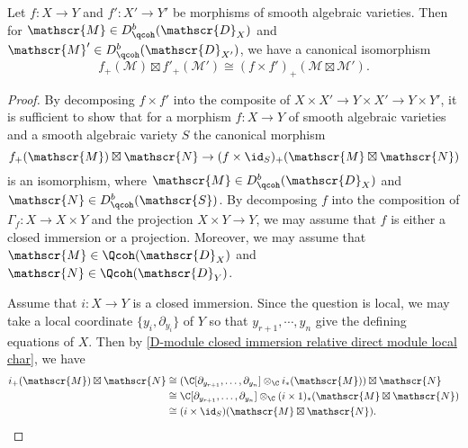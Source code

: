 \begin{proposition}\label{D-module integral Kunneth formula}
Let $f:X\to Y$ and $f':X'\to Y'$ be morphisms of smooth algebraic varieties. Then for $\mathscr{M}\in D^b_{\qcoh}(\mathscr{D}_X)$ and $\mathscr{M}'\in D^b_{\qcoh}(\mathscr{D}_{X'})$, we have a canonical isomorphism
\[f_+(\mathscr{M})\boxtimes f'_+(\mathscr{M}')\cong (f\times f')_+(\mathscr{M}\boxtimes\mathscr{M}').\]
\end{proposition}
\begin{proof}
By decomposing $f\times f'$ into the composite of $X\times X'\to Y\times X'\to Y\times Y'$, it is sufficient to show that for a morphism $f:X\to Y$ of smooth algebraic varieties and a smooth algebraic variety $S$ the canonical morphism
\[f_+(\mathscr{M})\boxtimes \mathscr{N}\to (f\times\id_S)_+(\mathscr{M}\boxtimes\mathscr{N})\]
is an isomorphism, where $\mathscr{M}\in D^b_{\qcoh}(\mathscr{D}_X)$ and $\mathscr{N}\in D^b_{\qcoh}(\mathscr{S})$. By decomposing $f$ into the composition of $\Gamma_f:X\to X\times Y$ and the projection $X\times Y\to Y$, we may assume that $f$ is either a closed immersion or a projection. Moreover, we may assume that $\mathscr{M}\in\Qcoh(\mathscr{D}_X)$ and $\mathscr{N}\in\Qcoh(\mathscr{D}_Y)$.\par
Assume that $i:X\to Y$ is a closed immersion. Since the question is local, we may take a local coordinate $\{y_i,\partial_{y_i}\}$ of $Y$ so that $y_{r+1},\cdots,y_n$ give the defining equations of $X$. Then by \cref{D-module closed immersion relative direct module local char}, we have
\begin{align*}
i_+(\mathscr{M})\boxtimes\mathscr{N}&\cong(\C[\partial_{y_{r+1}},\dots,\partial_{y_n}]\otimes_\C i_*(\mathscr{M}))\boxtimes\mathscr{N}\\
&\cong \C[\partial_{y_{r+1}},\dots,\partial_{y_n}]\otimes_\C(i\times 1)_*(\mathscr{M}\boxtimes\mathscr{N})\\
&\cong (i\times\id_S)(\mathscr{M}\boxtimes\mathscr{N}).
\end{align*}


\end{proof}
